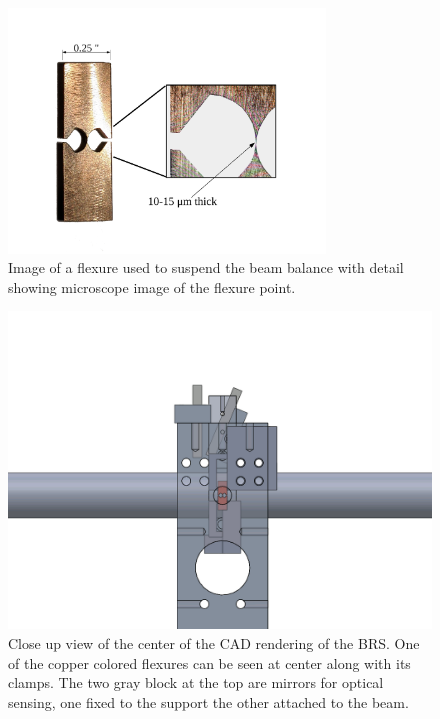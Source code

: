 \documentclass [12pt, proquest]{uwthesis}[2019]
\begin{document}
\begin{figure}[!h]
\begin{center}
 \includegraphics[width=0.75\textwidth]{Flexure.pdf}
\caption[Image of a BRS flexure]{Image of a flexure used to suspend the beam balance with detail showing microscope image of the flexure point.}
\label{flexure}
\end{center}
\end{figure}

\begin{figure}[!h]
\begin{center} 
\includegraphics[width=\textwidth]{BRSFrontDetail.png}
\end{center}
\caption[Close up view of the center of the CAD rendering of the BRS]{Close up view of the center of the CAD rendering of the BRS. One of the copper colored flexures can be seen at center along with its clamps. The two gray block at the top are mirrors for optical sensing, one fixed to the support the other attached to the beam.} \label{BRSFrontD}
\end{figure}
\end{document}
